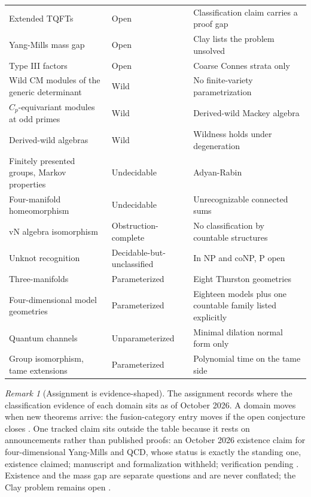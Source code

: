 \documentclass[11pt,letterpaper]{article}
\theoremstyle{definition}
\theoremstyle{remark}
\newtheorem{remark}[theorem]{Remark}
\begin{document}
\begin{longtable}{L{4.2cm}L{3.2cm}L{4.8cm}}
Extended TQFTs & Open & Classification claim carries a proof gap \cite{lurie2009} \\
Yang-Mills mass gap & Open & Clay lists the problem unsolved \cite{clay} \\
Type III factors & Open & Coarse Connes strata only \cite{vnwiki} \\
Wild CM modules of the generic determinant & Wild & No finite-variety parametrization \cite{buchweitz2005} \\
$C_p$-equivariant modules at odd primes & Wild & Derived-wild Mackey algebra \cite{grevstad2025} \\
Derived-wild algebras & Wild & Wildness holds under degeneration \cite{bekkert2003} \\
Finitely presented groups, Markov properties & Undecidable & Adyan-Rabin \cite{rabin1958} \\
Four-manifold homeomorphism & Undecidable & Unrecognizable connected sums \cite{tancer2023} \\
vN algebra isomorphism & Obstruction-complete & No classification by countable structures \cite{sasyk2009} \\
Unknot recognition & Decidable-but-unclassified & In NP and coNP, P open \cite{hass1999,lackenby2021} \\
Three-manifolds & Parameterized & Eight Thurston geometries \cite{geometrization} \\
Four-dimensional model geometries & Parameterized & Eighteen models plus one countable family listed explicitly \cite{geometrization,perelman,hillman} \\
Quantum channels & Unparameterized & Minimal dilation normal form only \cite{cstarwiki} \\
Group isomorphism, tame extensions & Parameterized & Polynomial time on the tame side \cite{grochow2015} \\
\end{longtable}
\endgroup

\begin{remark}[Assignment is evidence-shaped]
The assignment records where the classification evidence of each domain sits as of October 2026. A domain moves when new theorems arrive: the fusion-category entry moves if the open conjecture closes \cite{fusionnlab}. One tracked claim sits outside the table because it rests on announcements rather than published proofs: an October 2026 existence claim for four-dimensional Yang-Mills and QCD, whose status is exactly the standing one, existence claimed; manuscript and formalization withheld; verification pending \cite{openai,kitp}. Existence and the mass gap are separate questions and are never conflated; the Clay problem remains open \cite{clay,kitp}.
\end{remark}
\end{document}
